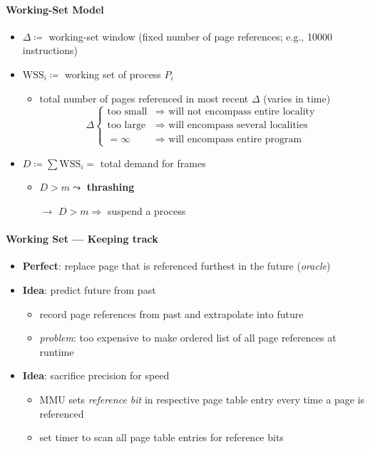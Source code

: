 \paragraph{Working-Set Model}
\begin{itemize}
  \item $ \Delta \coloneqq $ working-set window (fixed number of page references; e.g., 10000 instructions)
  \item $ \text{WSS}_i \coloneqq $ working set of process $ P_i $
  \begin{itemize}
    \item total number of pages referenced in most recent $ \Delta $ (varies in time)
    \begin{equation*}
      \Delta \begin{cases}
      \text{too small} &\Rightarrow \text{ will not encompass entire locality} \\
      \text{too large} &\Rightarrow \text{ will encompass several localities} \\
      = \infty &\Rightarrow \text{ will encompass entire program}
    \end{cases}
    \end{equation*}
  \end{itemize}
  \item $ D \coloneqq \sum \text{WSS}_i = $ total demand for frames
  \begin{itemize}
    \item $ D > m \leadsto $ \textbf{thrashing}
    \item[$ \to $] $ D > m \Rightarrow $ suspend a process
  \end{itemize}
\end{itemize}

\paragraph{Working Set --- Keeping track}
\begin{itemize}
  \item \textbf{Perfect}: replace page that is referenced furthest in the future (\emph{oracle})
  \item \textbf{Idea}: predict future from past
  \begin{itemize}
    \item record page references from past and extrapolate into future
    \item \emph{problem}: too expensive to make ordered list of all page references at runtime
  \end{itemize}
  \item \textbf{Idea}: sacrifice precision for speed
  \begin{itemize}
    \item MMU sets \emph{reference bit} in respective page table entry every time a page is referenced
    \item set timer to scan all page table entries for reference bits
  \end{itemize}
\end{itemize}

